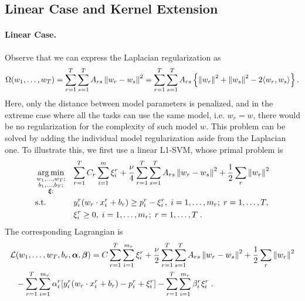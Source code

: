 \subsection{Linear Case and Kernel Extension}
\paragraph*{Linear Case.\\}
Observe that we can express the Laplacian regularization as
\begin{equation}
    \nonumber
    \Omega(w_1, \ldots, w_T) = \sum_{r=1}^T \sum_{s=1}^T A_{rs} \left\lVert w_r - w_s\right\rVert^2 =  \sum_{r=1}^T \sum_{s=1}^T A_{rs} \left\{ \left\lVert w_r\right\rVert^2 + \left\lVert w_s\right\rVert^2 - 2 \langle w_r, w_s \rangle \right\}.
\end{equation}
Here, only the distance between model parameters is penalized, and in the extreme case where all the tasks can use the same model, i.e. $w_r = w$, there would be no regularization for the complexity of such model $w$.
This problem can be solved by adding the individual model regularization aside from the Laplacian one.
To illustrate this, we first use a linear L1-SVM, whose primal problem is
\begin{equation}\label{eq:linear_gl_primal}
\begin{aligned}
& \argmin_{\substack{w_1, \ldots, w_\ntasks ; \\ \substack{b_1, \ldots, b_\ntasks } ; \\ \substack{\fv{\xi}}; }}
& & {\sum_{r=1}^T C_r \sum_{i=1}^m{\xi_{i}^r} + \frac{\nu}{4} \sum_{r=1}^T \sum_{s=1}^T A_{rs} \norm{w_r - w_s}^2 + \frac{1}{2} \sum_r \norm{w_r}^2 }\\
& \text{s.t.}
& & y_{i}^r ( w_r \cdot x_{i}^r + b_r) \geq p_{i}^r - \xi_{i}^r , \;  i=1,\ldots,m_r; \;  r=1,\ldots,T,\\
& & & \xi_{i}^r \geq 0, \;  i=1,\ldots,m_r; \;  r=1,\ldots,T \; .
\end{aligned}
\end{equation}
The corresponding Lagrangian is
\begin{equation}\label{eq:svmmtl_lagr_GL_addreg}
\begin{aligned}
        \mathcal{L}&(w_1, \ldots, w_\ntasks, b_r, \fv{\alpha}, \fv{\beta}) = C \sum_{r=1}^T \sum_{i=1}^{m_r}{\xi_{i}^r} + \frac{\nu}{2} \sum_{r=1}^T \sum_{s=1}^T A_{rs} \norm{w_r - w_s}^2 + \frac{1}{2} \sum_r \norm{w_r}^2 \\
        & - \sum_{r=1}^T \sum_{i=1}^{m_r}{ \alpha_i^r [y_{i}^r (w_r \cdot x_{i}^r + b_r) - p_{i}^r + \xi_{i}^r]   } - \sum_{r=1}^T \sum_{i=1}^{m_r}{ \beta_i^r \xi_i^r } \; .
\end{aligned}
\end{equation}
